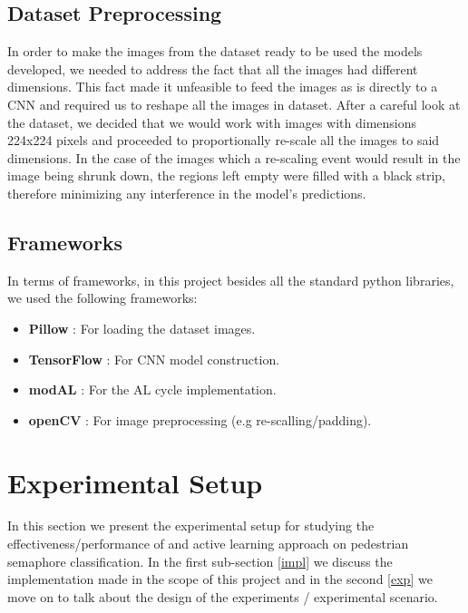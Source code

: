 \documentclass[journal, a4paper]{IEEEtran}
\begin{document}
\subsection{Dataset Preprocessing} \label{dpp}

In order to make the images from the \cite{PVTL} dataset ready to be used the models 
developed, we needed to address the fact that all the images had different dimensions.
This fact made it unfeasible to feed the images as is directly to a CNN and 
required us to reshape all the images in dataset. After a careful look 
at the dataset, we decided that we would work with images with dimensions 224x224 pixels and
proceeded to proportionally re-scale all the images to said dimensions. In the case of the images
which a re-scaling event would result in the image being shrunk down, the regions left empty 
were filled with a black strip, therefore minimizing any interference in the model's predictions.

\subsection{Frameworks} \label{frmw}

In terms of frameworks, in this project besides all the standard python libraries, we used
the following frameworks:

\begin{itemize}
    \item \textbf{Pillow} \cite{PIL}: For loading the dataset images.
    \item \textbf{TensorFlow} \cite{tensorflow}: For CNN model construction.
    \item \textbf{modAL} \cite{modAL}: For the AL cycle implementation.
    \item \textbf{openCV} \cite{openCV}: For image preprocessing (e.g re-scalling/padding).
\end{itemize}

\section{Experimental Setup}

In this section we present the experimental setup for studying the effectiveness/performance of 
and active learning approach on pedestrian semaphore classification. In the first sub-section 
\ref{impl} we discuss the implementation made in the scope of this project and in the second 
\ref{exp} we move on to talk about the design of the experiments / experimental scenario.
\end{document}
